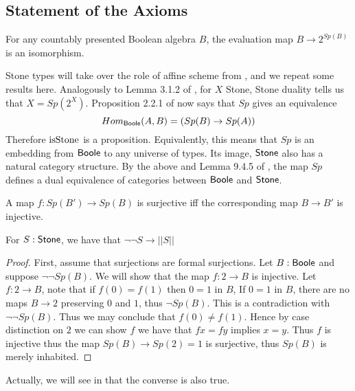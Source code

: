 
\subsection{Statement of the Axioms}
\begin{axiomNum}
  For any countably presented Boolean algebra $B$, the evaluation map $B\rightarrow  2^{Sp(B)}$ is an isomorphism.
\end{axiomNum} 

\begin{remark}
Stone types will take over the role of affine scheme from \cite{draft}, 
and we repeat some results here. 
Analogously to Lemma 3.1.2 of \cite{draft}, 
for $X$ Stone, Stone duality tells us that $X = Sp(2^X)$. 
%
Proposition 2.2.1 of \cite{draft} now says that 
$Sp$ gives an equivalence 
\begin{equation}
   Hom_{\mathsf{Boole}} (A, B) = (Sp(B) \to Sp(A))
\end{equation}
Therefore $\mathrm{isStone}$ is a proposition.
Equivalently, 
this means that 
$Sp$ is an embedding from $\mathsf{Boole}$ to any universe of types.
Its image, $\mathsf{Stone}$ also has a natural category structure.
By the above and Lemma 9.4.5 of \cite{hott}, 
the map $Sp$ defines a dual equivalence of categories between $\mathsf{Boole}$ and $\mathsf{Stone}$.
\end{remark}

\begin{axiomNum}
  A map $f:Sp(B')\to Sp(B)$ is surjective iff the corresponding map $B \to B'$ is injective.
\end{axiomNum} 

\begin{lemma}\label{LemSurjectionsFormalToCompleteness}
 For $S:\mathsf{Stone}$, we have that $\neg \neg S \to || S ||$
\end{lemma}
\begin{proof}
  First, assume that surjections are formal surjections. 
  Let $B:\mathsf{Boole}$ and suppose $\neg \neg Sp(B)$. 
  We will show that the map $f:2\to B$ is injective. 
  Let $f:2 \to B$, note that if $f(0) = f(1)$ then $0=1$ in $B$, 
  If $0=1$ in $B$, there are no maps $B\to 2$ preserving $0$ and $1$, thus $\neg Sp(B)$. 
  This is a contradiction with $\neg \neg Sp(B)$. Thus we may conclude that $f(0)\neq f(1)$. 
  Hence by case distinction on $2$ we can show $f$ we have that $f x = f y$ implies $ x= y$. Thus 
  $f$ is injective thus the map $Sp(B) \to Sp(2) = 1$ is surjective, thus $Sp(B)$ is merely inhabited. 
\end{proof} 
Actually, we will see in  that the converse is also true. 

